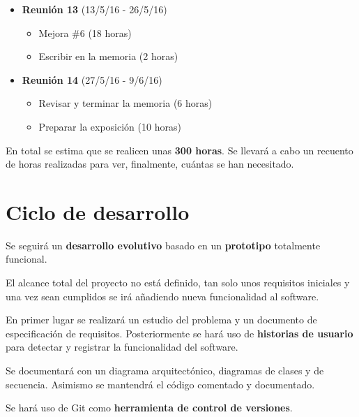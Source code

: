 \begin{itemize}
	\item \textbf{Reunión 13} (13/5/16 - 26/5/16)
	\begin{itemize}
		\item Mejora \#6 (18 horas)
		\item Escribir en la memoria (2 horas)
	\end{itemize}
	
	\item \textbf{Reunión 14} (27/5/16 - 9/6/16)
	\begin{itemize}
		\item Revisar y terminar la memoria (6 horas)
		\item Preparar la exposición (10 horas)
	\end{itemize}
\end{itemize}

En total se estima que se realicen unas \textbf{300 horas}. Se llevará a cabo un recuento de horas realizadas para ver, finalmente, cuántas se han necesitado.

\section{Ciclo de desarrollo}

Se seguirá un \textbf{desarrollo evolutivo} basado en un \textbf{prototipo} totalmente funcional. 

El alcance total del proyecto no está definido, tan solo unos requisitos iniciales y una vez sean cumplidos se irá añadiendo nueva funcionalidad al software.

En primer lugar se realizará un estudio del problema y un documento de especificación de requisitos. Posteriormente se hará uso de \textbf{historias de usuario} para detectar y registrar la funcionalidad del software.

Se documentará con un diagrama arquitectónico, diagramas de clases y de secuencia. Asimismo se mantendrá el código comentado y documentado.

Se hará uso de Git como \textbf{herramienta de control de versiones}.